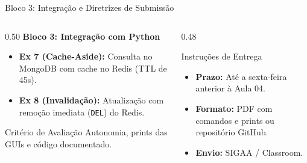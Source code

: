 \begin{frame}{Bloco 3: Integração e Diretrizes de Submissão}
  \begin{columns}[T]
    \begin{column}{0.50\textwidth}
      \textbf{Bloco 3: Integração com Python}
      {\footnotesize
      \begin{itemize}
        \item \textbf{Ex 7 (Cache-Aside):} Consulta no MongoDB com cache no Redis (TTL de 45s).
        \item \textbf{Ex 8 (Invalidação):} Atualização com remoção imediata (\texttt{DEL}) do Redis.
      \end{itemize}
      }

      \begin{block}{Critério de Avaliação}
        {\footnotesize Autonomia, prints das GUIs e código documentado.}
      \end{block}
    \end{column}

    \begin{column}{0.48\textwidth}
      \begin{exampleblock}{Instruções de Entrega}
        {\footnotesize
        \begin{itemize}
          \item \textbf{Prazo:} Até a sexta-feira anterior à Aula 04.
          \item \textbf{Formato:} PDF com comandos e prints ou repositório GitHub.
          \item \textbf{Envio:} SIGAA / Classroom.
        \end{itemize}
        }
      \end{exampleblock}
    \end{column}
  \end{columns}
\end{frame}
